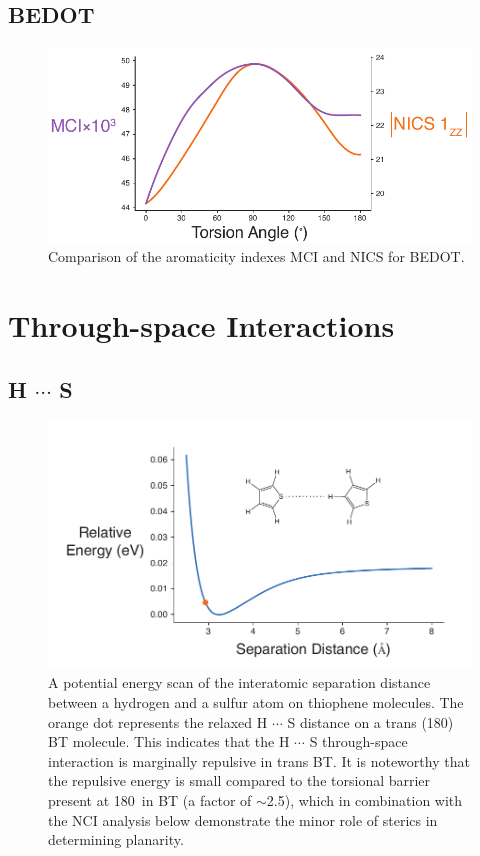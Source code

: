 \subsection{BEDOT}
\begin{figure}[hbt!]
    \centering
    \includegraphics{figures/append_aroma/pedot_aroma_compare_copy.pdf}
    \caption[Comparison of the Aromaticity Indexes MCI and NICS for BEDOT]{Comparison of the aromaticity indexes MCI and NICS for BEDOT.}
    \label{fig:pedot_aroma_compare}
\end{figure}

\clearpage
\section{Through-space Interactions}\label{sec:aroma_ts}
\subsection{\texorpdfstring{H $\cdots$ S}{HS}}
\begin{figure}[hbt!]
    \centering
    \includegraphics{figures/append_aroma/ts_t_t_copy.pdf}
    \caption[\texorpdfstring{H $\cdots$ S}{HS} Through-space Calculation]{A potential energy scan of the interatomic separation distance between a hydrogen and a sulfur atom on thiophene molecules. The orange dot represents the relaxed H $\cdots$ S distance on a trans (180\textdegree) BT molecule. This indicates that the H $\cdots$ S through-space interaction is marginally repulsive in trans BT. It is noteworthy that the repulsive energy is small compared to the torsional barrier present at 180\textdegree \ in BT (a factor of $\sim$2.5), which in combination with the NCI analysis below demonstrate the minor role of sterics in determining planarity.}
    \label{fig:ts_t_t}
\end{figure}
\clearpage

